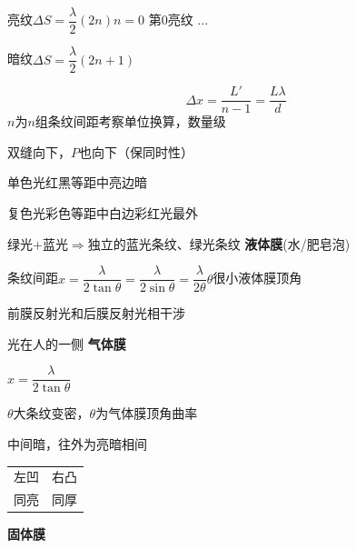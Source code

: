
亮纹\quad $\Delta S=\dfrac{\lambda}{2}(2n)$\quad $n=0$ 第0亮纹 ...

暗纹\quad $\Delta S=\dfrac{\lambda}{2}(2n+1)$\quad {}

\[\Delta x=\frac{L'}{n-1}=\frac{L\lambda}{d}\] %
$n$为$n$组条纹间距\quad 考察单位换算，数量级 %

双缝向下，$P$也向下（保同时性）

单色光\quad 红黑等距\quad 中亮边暗

复色光\quad 彩色等距\quad 中白边彩\quad 红光最外

绿光$+$蓝光$\Rightarrow$独立的蓝光条纹、绿光条纹
\textbf{液体膜}(水/肥皂泡)

条纹间距\quad $x=\dfrac{\lambda}{2\tan\theta}=\dfrac{\lambda}{2\sin\theta}=\dfrac{\lambda}{2\theta}$\quad $\theta$很小\quad 液体膜顶角


前膜反射光和后膜反射光相干涉

光在人的一侧
\textbf{气体膜}



$x=\dfrac{\lambda}{2\tan\theta}$

$\theta$大条纹变密，$\theta$为气体膜顶角\quad 曲率

中间暗，往外为亮暗相间



\begin{tabular}{@{}cc@{\qquad}}
左凹 & 右凸 \\
同亮 & 同厚
\end{tabular}
\textbf{固体膜}

